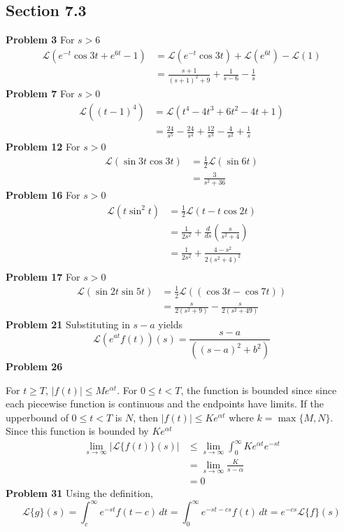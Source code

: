 \subsection*{Section 7.3}
\textbf{Problem 3}
    For $s>6$
    \begin{align*}
        \mathscr{L}(e^{-t}\cos 3t + e^{6t} - 1)
        &= \mathscr{L}(e^{-t}\cos 3t) + \mathscr{L}(e^{6t}) - \mathscr{L}(1) \\
        &= \frac{s+1}{(s+1)^2+9} + \frac{1}{s-6} - \frac{1}{s}
    \end{align*}
\textbf{Problem 7}
    For $s>0$
    \begin{align*}
        \mathscr{L}((t-1)^4)
        &= \mathscr{L}(t^4-4t^3+6t^2-4t+1) \\
        &= \frac{24}{s^5} - \frac{24}{s^4} + \frac{12}{s^3}
            - \frac{4}{s^2} + \frac{1}{s}
    \end{align*}
\textbf{Problem 12}
    For $s>0$
    \begin{align*}
        \mathscr{L}(\sin 3t \cos 3t)
        &= \frac{1}{2} \mathscr{L}(\sin 6t) \\
        &= \frac{3}{s^2+36}
    \end{align*}
\textbf{Problem 16}
    For $s>0$
    \begin{align*}
        \mathscr{L}(t\sin^2 t)
        &= \frac{1}{2}\mathscr{L}(t - t\cos 2t) \\
        &= \frac{1}{2s^2} + \frac{d}{ds}(\frac{s}{s^2+4}) \\
        &= \frac{1}{2s^2} + \frac{4-s^2}{2(s^2+4)^2} \\
    \end{align*}
\textbf{Problem 17}
    For $s>0$
    \begin{align*}
        \mathscr{L}(\sin 2t \sin 5t)
        &= \frac{1}{2}\mathscr{L}((\cos 3t - \cos 7t)) \\
        &= \frac{s}{2(s^2+9)} - \frac{s}{2(s^2+49)}
    \end{align*}
\textbf{Problem 21}
    Substituting in $s-a$ yields
    \[
        \mathscr{L}(e^{at}f(t))(s) 
        = \frac{s-a}{((s-a)^2 + b^2)}
    \]
\textbf{Problem 26}

    For $t \geq T$, $|f(t)| \leq Me^{\alpha t}$.
    For $0 \leq t < T$, the function is bounded since 
    since each piecewise function is continuous and the endpoints have limits.
    If the upperbound of $0 \leq t < T$ is $N$, 
    then $|f(t)| \leq Ke^{\alpha t}$ where $k = \max \{M, N\}$. \\

    Since this function is bounded by $Ke^{\alpha t}$
    \begin{align*}
        \lim_{s \to \infty }|\mathscr{L}\{f(t)\}(s)|
        &\leq \lim_{s \to \infty } \int_0^\infty Ke^{\alpha t}e^{-st} \\
        &= \lim_{s \to \infty } \frac{K}{s-\alpha} \\
        &= 0
    \end{align*}
\textbf{Problem 31}
    Using the definition,
    \[
        \mathscr{L}\{g\}(s)
        = \int_c^\infty e^{-st}f(t-c) \,dt 
        = \int_0^\infty e^{-st-cs}f(t) \,dt 
        = e^{-cs } \mathscr{L}\{f\}(s) 
    \]